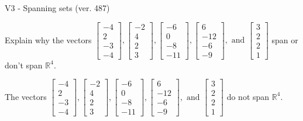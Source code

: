 \begin{exercise}
  \begin{exerciseTitle}V3 - Spanning sets (ver. 487)\end{exerciseTitle}
  \begin{exerciseStatement}
    Explain why the vectors \(\left[\begin{array}{r}
-4 \\
2 \\
-3 \\
-4
\end{array}\right] , \left[\begin{array}{r}
-2 \\
4 \\
2 \\
3
\end{array}\right] , \left[\begin{array}{r}
-6 \\
0 \\
-8 \\
-11
\end{array}\right] , \left[\begin{array}{r}
6 \\
-12 \\
-6 \\
-9
\end{array}\right] , \text{ and } \left[\begin{array}{r}
3 \\
2 \\
2 \\
1
\end{array}\right]\) span or don't span \(\mathbb{R}^4\). 
	


  \end{exerciseStatement}
  \begin{exerciseAnswer}
   The vectors \(\left[\begin{array}{r}
-4 \\
2 \\
-3 \\
-4
\end{array}\right] , \left[\begin{array}{r}
-2 \\
4 \\
2 \\
3
\end{array}\right] , \left[\begin{array}{r}
-6 \\
0 \\
-8 \\
-11
\end{array}\right] , \left[\begin{array}{r}
6 \\
-12 \\
-6 \\
-9
\end{array}\right] , \text{ and } \left[\begin{array}{r}
3 \\
2 \\
2 \\
1
\end{array}\right]\) 
  	 do not  
	span \(\mathbb{R}^4\).
  



\end{exerciseAnswer}
\end{exercise}

